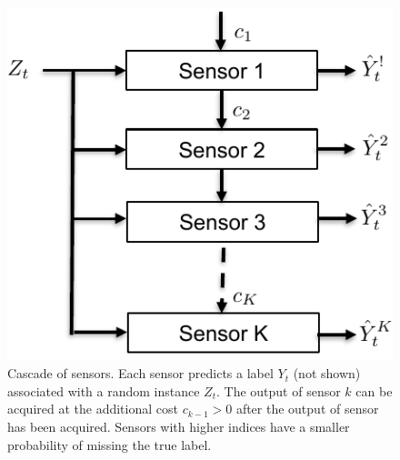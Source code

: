 \begin{figure}
	\vspace{-.5cm}
	\centering
	\includegraphics[scale=.6]{../Figures/SensorCascade}
	\caption{Cascade of sensors.
	Each sensor predicts a label $Y_t$ (not shown) associated
	with a random instance $Z_t$. The output of sensor $k$
	can be acquired at the additional cost $c_{k-1}>0$ after 
	the output of sensor has been acquired. Sensors with higher indices
	have a smaller probability of missing the true label.
	}\label{wrap-fig:1}
	\vspace{-.5cm}
\end{figure} 

